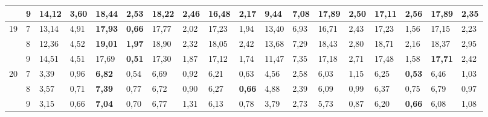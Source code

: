 \documentclass[conference]{IEEEtran}
\begin{document}
\begin{table}[]
\begin{tabular}{|cl|ll|ll|ll|ll|ll|ll|ll|ll|}
		\multicolumn{1}{|c|}{} & 9 & \multicolumn{1}{l|}{14,12} & 3,60 & \multicolumn{1}{l|}{\textbf{18,44}} & 2,53 & \multicolumn{1}{l|}{18,22} & 2,46 & \multicolumn{1}{l|}{16,48} & \textbf{2,17} & \multicolumn{1}{l|}{9,44} & 7,08 & \multicolumn{1}{l|}{17,89} & 2,50 & \multicolumn{1}{l|}{17,11} & 2,56 & \multicolumn{1}{l|}{17,89} & 2,35 \\ \hline
		\multicolumn{1}{|c|}{\multirow{3}{*}{19}} & 7 & \multicolumn{1}{l|}{13,14} & 4,91 & \multicolumn{1}{l|}{\textbf{17,93}} & \textbf{0,66} & \multicolumn{1}{l|}{17,77} & 2,02 & \multicolumn{1}{l|}{17,23} & 1,94 & \multicolumn{1}{l|}{13,40} & 6,93 & \multicolumn{1}{l|}{16,71} & 2,43 & \multicolumn{1}{l|}{17,23} & 1,56 & \multicolumn{1}{l|}{17,15} & 2,23 \\ \cline{2-18} 
		\multicolumn{1}{|c|}{} & 8 & \multicolumn{1}{l|}{12,36} & 4,52 & \multicolumn{1}{l|}{\textbf{19,01}} & \textbf{1,97} & \multicolumn{1}{l|}{18,90} & 2,32 & \multicolumn{1}{l|}{18,05} & 2,42 & \multicolumn{1}{l|}{13,68} & 7,29 & \multicolumn{1}{l|}{18,43} & 2,80 & \multicolumn{1}{l|}{18,71} & 2,16 & \multicolumn{1}{l|}{18,37} & 2,95 \\ \cline{2-18} 
		\multicolumn{1}{|c|}{} & 9 & \multicolumn{1}{l|}{14,51} & 4,51 & \multicolumn{1}{l|}{17,69} & \textbf{0,51} & \multicolumn{1}{l|}{17,30} & 1,87 & \multicolumn{1}{l|}{17,12} & 1,74 & \multicolumn{1}{l|}{11,47} & 7,35 & \multicolumn{1}{l|}{17,18} & 2,71 & \multicolumn{1}{l|}{17,48} & 1,58 & \multicolumn{1}{l|}{\textbf{17,71}} & 2,42 \\ \hline
		\multicolumn{1}{|c|}{\multirow{3}{*}{20}} & 7 & \multicolumn{1}{l|}{3,39} & 0,96 & \multicolumn{1}{l|}{\textbf{6,82}} & 0,54 & \multicolumn{1}{l|}{6,69} & 0,92 & \multicolumn{1}{l|}{6,21} & 0,63 & \multicolumn{1}{l|}{4,56} & 2,58 & \multicolumn{1}{l|}{6,03} & 1,15 & \multicolumn{1}{l|}{6,25} & \textbf{0,53} & \multicolumn{1}{l|}{6,46} & 1,03 \\ \cline{2-18} 
		\multicolumn{1}{|c|}{} & 8 & \multicolumn{1}{l|}{3,57} & 0,71 & \multicolumn{1}{l|}{\textbf{7,39}} & 0,77 & \multicolumn{1}{l|}{6,72} & 0,90 & \multicolumn{1}{l|}{6,27} & \textbf{0,66} & \multicolumn{1}{l|}{4,88} & 2,39 & \multicolumn{1}{l|}{6,09} & 0,99 & \multicolumn{1}{l|}{6,37} & 0,75 & \multicolumn{1}{l|}{6,79} & 0,97 \\ \cline{2-18} 
		\multicolumn{1}{|c|}{} & 9 & \multicolumn{1}{l|}{3,15} & 0,66 & \multicolumn{1}{l|}{\textbf{7,04}} & 0,70 & \multicolumn{1}{l|}{6,77} & 1,31 & \multicolumn{1}{l|}{6,13} & 0,78 & \multicolumn{1}{l|}{3,79} & 2,73 & \multicolumn{1}{l|}{5,73} & 0,87 & \multicolumn{1}{l|}{6,20} & \textbf{0,66} & \multicolumn{1}{l|}{6,08} & 1,08 \\ \hline
	\end{tabular}
\end{table}
\end{document}
